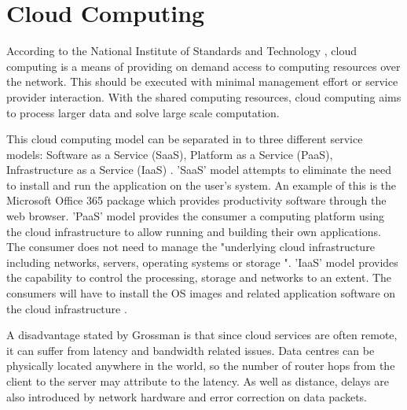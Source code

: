 \section{Cloud Computing}
According to the National Institute of Standards and Technology \cite{mell2011nist}, cloud computing is a means of providing on demand access to computing resources over the network. This should be executed with minimal management effort or service provider interaction. With the shared computing resources, cloud computing aims to process larger data and solve large scale computation.
\newline
\par
This cloud computing model can be separated in to three different service models: Software as a Service (SaaS), Platform as a Service (PaaS), Infrastructure as a Service (IaaS) \cite{jadeja2012cloud}. 'SaaS' model attempts to eliminate the need to install and run the application on the user's system. An example of this is the Microsoft Office 365 package which provides productivity software through the web browser. 'PaaS' model provides the consumer a computing platform using the cloud infrastructure to allow running and building their own applications. The consumer does not need to manage the "underlying cloud infrastructure including networks, servers, operating systems or storage \cite{mell2011nist}". 'IaaS' model provides the capability to control the processing, storage and networks to an extent. The consumers will have to install the OS images and related application software on the cloud infrastructure \cite{cloudservices}.
\newline
\par
A disadvantage stated by Grossman \cite{grossman2009case} is that since cloud services are often remote, it can suffer from latency and bandwidth related issues. Data centres can be physically located anywhere in the world, so the number of router hops from the client to the server may attribute to the latency. As well as distance, delays are also introduced by network hardware and error correction on data packets.

